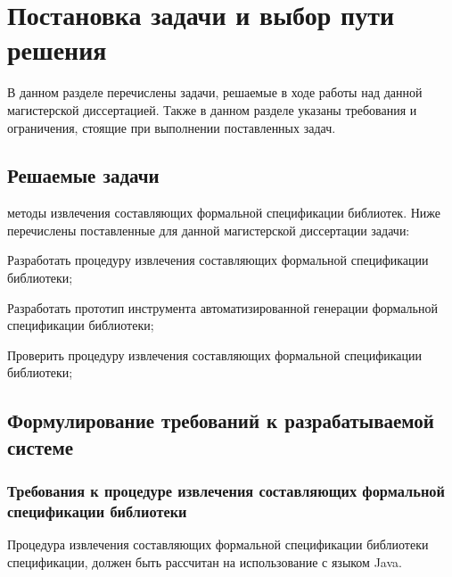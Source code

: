\chapter{Постановка задачи и выбор пути решения}

В данном разделе перечислены задачи, решаемые в ходе работы над данной магистерской диссертацией. Также в данном разделе указаны требования и ограничения, стоящие при выполнении поставленных задач.

\section{Решаемые задачи}

методы извлечения составляющих формальной спецификации библиотек.
Ниже перечислены поставленные для данной магистерской диссертации задачи:
%
\begin{itemize*}
\item Разработать процедуру извлечения составляющих формальной спецификации библиотеки;
\item Разработать прототип инструмента автоматизированной генерации формальной спецификации библиотеки;
\item Проверить процедуру извлечения составляющих формальной спецификации библиотеки;
\end{itemize*}
%

\section{Формулирование требований к разрабатываемой системе}

\subsection{Требования к процедуре извлечения составляющих формальной спецификации библиотеки}

Процедура извлечения составляющих формальной спецификации библиотеки спецификации, должен быть рассчитан на использование с языком Java.


